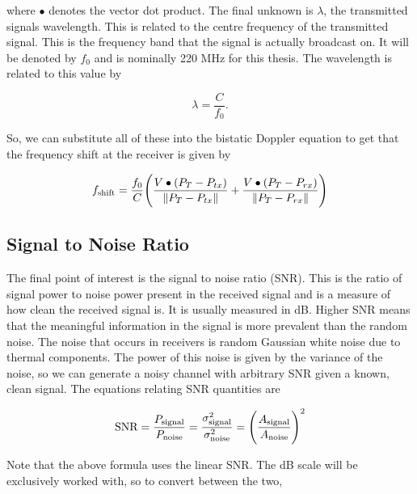 \documentclass[12pt,openany,a4paper]{book}
\begin{document}
\bigskip

where $\bullet$ denotes the vector dot product. The final unknown is $\lambda$, the transmitted signals wavelength. This is related to the centre frequency of the transmitted signal. This is the frequency band that the signal is actually broadcast on. It will be denoted by $f_0$ and is nominally 220 MHz for this thesis. The wavelength is related to this value by

\begin{equation}
\lambda = \frac{C}{f_0}.
\end{equation}

\bigskip

So, we can substitute all of these into the bistatic Doppler equation to get that the frequency shift at the receiver is given by

\begin{equation}
f_{\textnormal{shift}} = \frac{f_0}{C} \Bigg(\frac{V\bullet(P_T - P_{tx})}{\|P_T - P_{tx}\|} +  \frac{V\bullet(P_T - P_{rx})}{\|P_T - P_{rx}\|}\Bigg)
\end{equation}

\bigskip


\subsection{Signal to Noise Ratio}
\label{sec:snr}
The final point of interest is the signal to noise ratio (SNR). This is the ratio of signal power to noise power present in the received signal and is a measure of how clean the received signal is. It is usually measured in dB. Higher SNR means that the meaningful information in the signal is more prevalent than the random noise. The noise that occurs in receivers is random Gaussian white noise due to thermal components. The power of this noise is given by the variance of the noise, so we can generate a noisy channel with arbitrary SNR given a known, clean signal. The equations relating SNR quantities are

\begin{equation}
\textnormal{SNR} = \frac{P_{\textnormal{signal}}}{P_{\textnormal{noise}}} = \frac{\sigma_{\textnormal{signal}}^2}{\sigma_{\textnormal{noise}}^2} = \Bigg(\frac{A_{\textnormal{signal}}}{A_{\textnormal{noise}}} \Bigg)^2
\end{equation}

\bigskip

Note that the above formula uses the linear SNR. The dB scale will be exclusively worked with, so to convert between the two,
\end{document}
